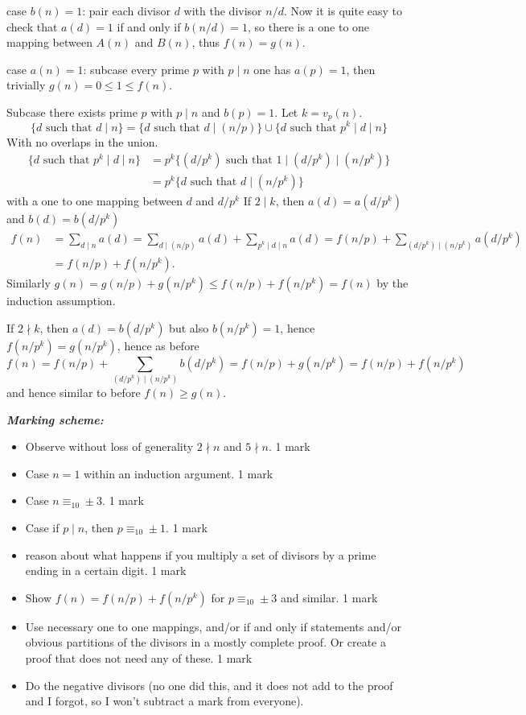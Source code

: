 \documentclass[12pt]{article}
\begin{document}
\begin{enumerate}[topsep=\bigskipamount,itemsep=\bigskipamount,leftmargin=0pt]
case $b(n)=1$: 
pair each divisor $d$ with the divisor $n/d$.
Now it is quite easy to check that $a(d)=1$ if and only if $b(n/d)=1$,
so there is a one to one mapping between $A(n)$ and $B(n)$, thus $f(n) = g(n)$.

case $a(n)=1$:
subcase every prime $p$ with $p\mid n$ one has $a(p)=1$,
then trivially $g(n) = 0\leq 1\leq f(n)$.

Subcase there exists prime $p$ with $p\mid n$ and $b(p)=1$.
Let $k = v_p(n)$.
$$\{d \text{ such that } d\mid n\} = 
\{d \text{ such that } d\mid (n/p)\}\cup \{d \text{ such that } p^k\mid d\mid n\}$$
With no overlaps in the union.
\begin{align*}
    \{d \text{ such that } p^k\mid d\mid n\} &= p^k\{(d/p^k) \text{ such that } 1\mid (d/p^k)\mid (n/p^k)\} \\
    &=p^k\{d \text{ such that } d\mid (n/p^k)\}
\end{align*}
with a one to one mapping between $d$ and $d/p^k$
If $2\mid k$, then $a(d) = a(d/p^k)$
and $b(d) = b(d/p^k)$
\begin{align*}
    f(n) &= \sum_{d\mid n} a(d) = \sum_{d\mid (n/p)} a(d) + \sum_{p^k\mid d\mid n} a(d) = f(n/p) + \sum_{(d/p^k)\mid (n/p^k)} a(d/p^k) \\
    &= f(n/p)+f(n/p^k).
\end{align*}
Similarly $g(n) = g(n/p)+g(n/p^k)\leq f(n/p)+f(n/p^k)=f(n)$ by the induction assumption.

If $2\nmid k$, then $a(d) = b(d/p^k)$ but also $b(n/p^k)=1$,
hence $f(n/p^k) = g(n/p^k)$,
hence as before
$$f(n)  = f(n/p) + \sum_{(d/p^k)\mid (n/p^k)} b(d/p^k)
= f(n/p) + g(n/p^k) = f(n/p)+f(n/p^k)$$
and hence similar to before $f(n)\geq g(n)$.

\textit{\textbf{Marking scheme:}}
\begin{itemize}
    \item Observe without loss of generality $2\nmid n$ and $5\nmid n$. 1 mark
    \item Case $n=1$  within an induction argument. 1 mark
    \item Case $n\equiv_{10} \pm 3$. 1 mark
    \item Case if $p\mid n$, then $p\equiv_{10}\pm 1$. 1 mark
    \item reason about what happens if you multiply a set of divisors by a prime ending in a certain digit. 1 mark
    \item Show $f(n) = f(n/p)+f(n/p^k)$ for $p\equiv_{10}\pm 3$
    and similar. 1 mark
    \item Use necessary one to one mappings, and/or if and only if statements and/or obvious partitions of the divisors in a mostly complete proof. Or create a proof that does not need any of these. 1 mark
    \item Do the negative divisors 
    (no one did this, 
    and it does not add to the proof
    and I forgot, so I won't subtract a mark from everyone).
\end{itemize}


\end{enumerate}
\end{document}
